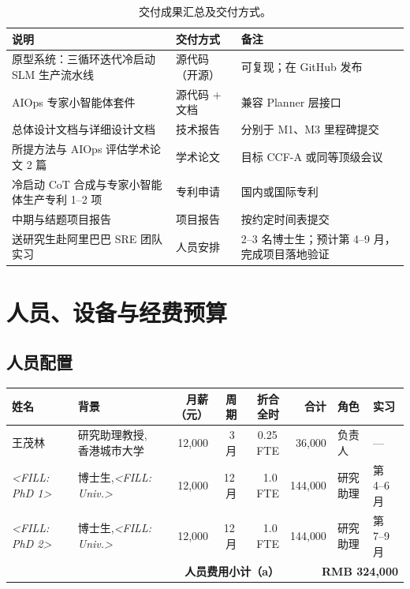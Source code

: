 \documentclass[lang=cn,a4paper,newtx,bibend=bibtex]{elegantpaper}
\begin{document}
\begin{table}[H]
\centering
\caption{交付成果汇总及交付方式。}
\renewcommand{\arraystretch}{1.4}
\begin{tabularx}{\linewidth}{X l p{4.8cm}}
\toprule
\textbf{说明} & \textbf{交付方式} & \textbf{备注}\\
\midrule
原型系统：三循环迭代冷启动 SLM 生产流水线 &
  源代码（开源） &
  可复现；在 GitHub 发布 \\
AIOps 专家小智能体套件 &
  源代码 + 文档 &
  兼容 Planner 层接口 \\
总体设计文档与详细设计文档 &
  技术报告 &
  分别于 M1、M3 里程碑提交 \\
所提方法与 AIOps 评估学术论文 2 篇 &
  学术论文 &
  目标 CCF-A 或同等顶级会议 \\
冷启动 CoT 合成与专家小智能体生产专利 1--2 项 &
  专利申请 &
  国内或国际专利 \\
中期与结题项目报告 &
  项目报告 &
  按约定时间表提交 \\
送研究生赴阿里巴巴 SRE 团队实习 &
  人员安排 &
  2--3 名博士生；预计第 4--9 月，完成项目落地验证 \\
\bottomrule
\end{tabularx}
\end{table}

\section{人员、设备与经费预算}

\subsection{人员配置}

\begin{table}[H]
\centering
\renewcommand{\arraystretch}{1.4}
\small
\begin{tabular}{p{2.2cm} p{2.8cm} r r r r p{1.4cm} p{1.4cm}}
\toprule
\textbf{姓名} & \textbf{背景} & \textbf{月薪（元）} & \textbf{周期} &
\textbf{折合全时} & \textbf{合计} & \textbf{角色} & \textbf{实习}\\
\midrule
王茂林 &
  研究助理教授,\newline 香港城市大学 &
  12{,}000 & 3\,月 & 0.25\,FTE & 36{,}000 & 负责人 & ---\\
\textit{<FILL: PhD 1>} &
  博士生,\newline \textit{<FILL: Univ.>} &
  12{,}000 & 12\,月 & 1.0\,FTE & 144{,}000 & 研究助理 & 第 4--6 月\\
\textit{<FILL: PhD 2>} &
  博士生,\newline \textit{<FILL: Univ.>} &
  12{,}000 & 12\,月 & 1.0\,FTE & 144{,}000 & 研究助理 & 第 7--9 月\\
\midrule
\multicolumn{5}{r}{\textbf{人员费用小计（a）}} & \multicolumn{3}{r}{\textbf{RMB 324{,}000}}\\
\bottomrule
\end{tabular}
\end{table}
\end{document}
